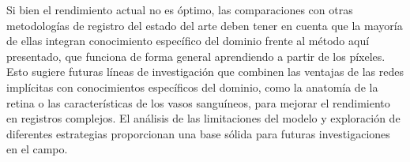 Si bien el rendimiento actual no es óptimo, las comparaciones con otras metodologías de registro del estado del arte deben tener en cuenta que la mayoría de ellas integran conocimiento específico del dominio frente al método aquí presentado, que funciona de forma general aprendiendo a partir de los píxeles. Esto sugiere futuras líneas de investigación que combinen las ventajas de las redes implícitas con conocimientos específicos del dominio, como la anatomía de la retina o las características de los vasos sanguíneos, para mejorar el rendimiento en registros complejos. El análisis de las limitaciones del modelo y exploración de diferentes estrategias proporcionan una base sólida para futuras investigaciones en el campo.